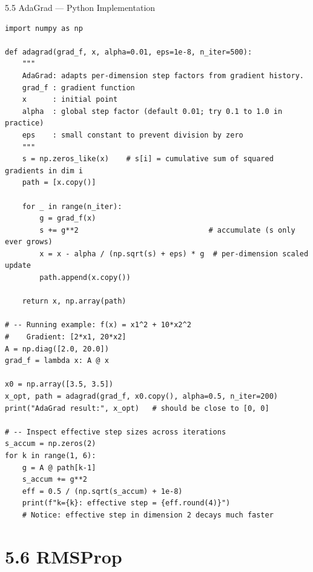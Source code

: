 \documentclass[aspectratio=169,10pt]{beamer}
\begin{document}
\begin{frame}[fragile]{5.5 AdaGrad --- Python Implementation}
\begin{lstlisting}[caption={AdaGrad (Python/NumPy)}]
import numpy as np

def adagrad(grad_f, x, alpha=0.01, eps=1e-8, n_iter=500):
    """
    AdaGrad: adapts per-dimension step factors from gradient history.
    grad_f : gradient function
    x      : initial point
    alpha  : global step factor (default 0.01; try 0.1 to 1.0 in practice)
    eps    : small constant to prevent division by zero
    """
    s = np.zeros_like(x)    # s[i] = cumulative sum of squared gradients in dim i
    path = [x.copy()]

    for _ in range(n_iter):
        g = grad_f(x)
        s += g**2                              # accumulate (s only ever grows)
        x = x - alpha / (np.sqrt(s) + eps) * g  # per-dimension scaled update
        path.append(x.copy())

    return x, np.array(path)

# -- Running example: f(x) = x1^2 + 10*x2^2
#    Gradient: [2*x1, 20*x2]
A = np.diag([2.0, 20.0])
grad_f = lambda x: A @ x

x0 = np.array([3.5, 3.5])
x_opt, path = adagrad(grad_f, x0.copy(), alpha=0.5, n_iter=200)
print("AdaGrad result:", x_opt)   # should be close to [0, 0]

# -- Inspect effective step sizes across iterations
s_accum = np.zeros(2)
for k in range(1, 6):
    g = A @ path[k-1]
    s_accum += g**2
    eff = 0.5 / (np.sqrt(s_accum) + 1e-8)
    print(f"k={k}: effective step = {eff.round(4)}")
    # Notice: effective step in dimension 2 decays much faster
\end{lstlisting}
\end{frame}

\section{5.6 RMSProp}
\end{document}
